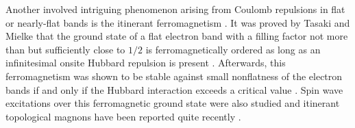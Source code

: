 \documentclass[amsmath,superscriptaddress,showpacs,aps,prb,twocolumn]{revtex4-1}
\begin{document}
\par Another involved intriguing phenomenon arising from Coulomb repulsions in flat or nearly-flat bands is the itinerant ferromagnetism \cite{T_PTP1998,T_PRL1992,M_PLA1993,MT_CMP1993,KMTT_EPL2010}. It was proved by Tasaki and Mielke that the ground state of a flat electron band with a filling factor not more than but sufficiently close to $1/2$ is ferromagnetically ordered as long as an infinitesimal onsite Hubbard repulsion is present \cite{T_PRL1992,M_PLA1993,MT_CMP1993}. Afterwards, this ferromagnetism was shown to be stable against small nonflatness of the electron bands if and only if the Hubbard interaction exceeds a critical value \cite{T_PRL1994}. Spin wave excitations over this ferromagnetic ground state were also studied \cite{KA_PRL1994,SGDL_PRB2018} and itinerant topological magnons have been reported quite recently \cite{SGDL_PRB2018}.
\end{document}
